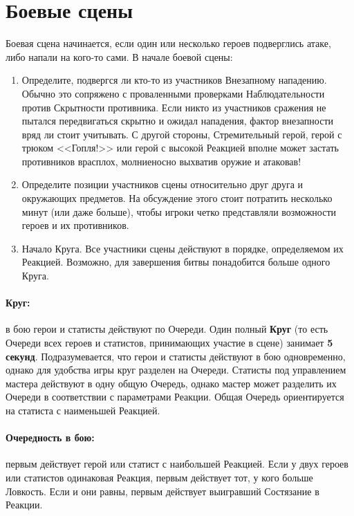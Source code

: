 \section{Боевые сцены}
Боевая сцена начинается, если один или несколько героев подверглись атаке, либо напали на кого-то сами. В начале боевой сцены:
\begin{enumerate}
\item Определите, подвергся ли кто-то из участников Внезапному нападению. Обычно это сопряжено с проваленными проверками Наблюдательности против Скрытности противника. Если никто из участников сражения не пытался передвигаться скрытно и ожидал нападения, фактор внезапности вряд ли стоит учитывать. С другой стороны, Стремительный герой, герой с трюком <<Гопля!>> или герой с высокой Реакцией вполне может застать противников врасплох, молниеносно выхватив оружие и атаковав!
\item Определите позиции участников сцены относительно друг друга и окружающих предметов. На обсуждение этого стоит потратить несколько минут (или даже больше), чтобы игроки четко представляли возможности героев и их противников.
\item Начало Круга. Все участники сцены действуют в порядке, определяемом их Реакцией. Возможно, для завершения битвы понадобится больше одного Круга.
\end{enumerate}
\paragraph{Круг:} в бою герои и статисты действуют по Очереди. Один полный \textbf{Круг} (то есть Очереди всех героев и статистов, принимающих участие в сцене) занимает \textbf{5 секунд}. Подразумевается, что герои и статисты действуют в бою одновременно, однако для удобства игры круг разделен на Очереди. Статисты под управлением мастера действуют в одну общую Очередь, однако мастер может разделить их Очереди в соответствии с параметрами Реакции. Общая Очередь ориентируется на статиста с наименьшей Реакцией.
\paragraph{Очередность в бою:} первым действует герой или статист с наибольшей Реакцией. Если у двух героев или статистов одинаковая Реакция, первым действует тот, у кого больше Ловкость. Если и они равны, первым действует выигравший Состязание в Реакции.
